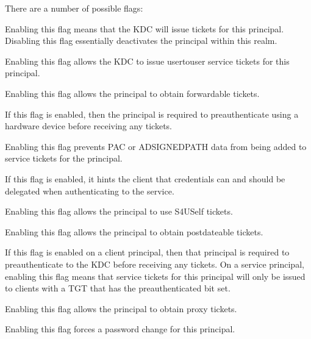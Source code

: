 \documentclass[letterpaper,10pt,english]{sphinxmanual}
\begin{document}
\begin{description}
\sphinxAtStartPar
There are a number of possible flags:
\begin{description}
\sphinxAtStartPar
Enabling this flag means that the KDC will issue tickets for
this principal.  Disabling this flag essentially deactivates
the principal within this realm.

\sphinxAtStartPar
Enabling this flag allows the KDC to issue user\sphinxhyphen{}to\sphinxhyphen{}user
service tickets for this principal.

\sphinxAtStartPar
Enabling this flag allows the principal to obtain forwardable
tickets.

\sphinxAtStartPar
If this flag is enabled, then the principal is required to
preauthenticate using a hardware device before receiving any
tickets.

\sphinxAtStartPar
Enabling this flag prevents PAC or AD\sphinxhyphen{}SIGNEDPATH data from
being added to service tickets for the principal.

\sphinxAtStartPar
If this flag is enabled, it hints the client that credentials
can and should be delegated when authenticating to the
service.

\sphinxAtStartPar
Enabling this flag allows the principal to use S4USelf tickets.

\sphinxAtStartPar
Enabling this flag allows the principal to obtain postdateable
tickets.

\sphinxAtStartPar
If this flag is enabled on a client principal, then that
principal is required to preauthenticate to the KDC before
receiving any tickets.  On a service principal, enabling this
flag means that service tickets for this principal will only
be issued to clients with a TGT that has the preauthenticated
bit set.

\sphinxAtStartPar
Enabling this flag allows the principal to obtain proxy
tickets.

\sphinxAtStartPar
Enabling this flag forces a password change for this
principal.


\end{description}
\end{description}
\end{document}
